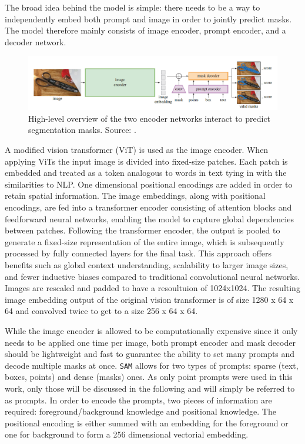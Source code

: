The broad idea behind the model is simple: there needs to be a way to independently embed both prompt and image in order to jointly predict masks. The model therefore mainly consists of image encoder, prompt encoder, and a decoder network.
\begin{figure}
	\centering
	\includegraphics[width=\textwidth]{"images/sam_overview.png"}
	\caption[\texttt{SAM} Overview]{High-level overview of the two encoder networks interact to predict segmentation masks. Source: \cite{kirillov2023segment}.}
	\label{figsamoverview}
\end{figure}
A modified vision transformer \cite{dosovitskiy2020image} (ViT) is used as the image encoder. When applying ViTs the input image is divided into fixed-size patches. Each patch is embedded and treated as a token analogous to words in text tying in with the similarities to NLP. One dimensional positional encodings are added in order to retain spatial information. The image embeddings, along with positional encodings, are fed into a transformer encoder \cite{vaswani2017attention} consisting of attention blocks and feedforward neural networks, enabling the model to capture global dependencies between patches. Following the transformer encoder, the output is pooled to generate a fixed-size representation of the entire image, which is subsequently processed by fully connected layers for the final task. This approach offers benefits such as global context understanding, scalability to larger image sizes, and fewer inductive biases compared to traditional convolutional neural networks. Images are rescaled and padded to have a resoultuion of 1024x1024. The resulting image embedding output of the original vision transformer is of size 1280 x 64 x 64 and convolved twice to get to a size 256 x 64 x 64. 

While the image encoder is allowed to be computationally expensive since it only needs to be applied one time per image, both prompt encoder and mask decoder should be lightweight and fast to guarantee the ability to set many prompts and decode multiple masks at once. \texttt{SAM} allows for two types of prompts: sparse (text, boxes, points) and dense (masks) ones. As only point prompts were used in this work, only those will be discussed in the following and will simply be referred to as prompts. In order to encode the prompts, two pieces of information are required: foreground/background knowledge and positional knowledge. The positional encoding is either summed with an embedding for the foreground or one for background to form a 256 dimensional vectorial embedding.

